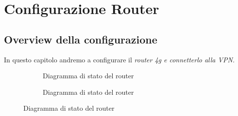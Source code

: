 
\chapter{Configurazione Router}

\section{Overview della configurazione}

In questo capitolo andremo a configurare il \it{router 4g} e connetterlo alla VPN.

\newsavebox{\myimage}

\begin{figure}[H]
    \centering%
    \begin{subfigure}{0.4\textwidth}
        \centering
        \usebox{\myimage}
        \caption{Diagramma di stato del router}
        \label{fig:diag-router}
    \end{subfigure}
    \hfill%
    \begin{subfigure}{0.5\textwidth}
        \centering
        \caption{Diagramma di stato del router}
        \label{fig:diag-router1}
    \end{subfigure}
\end{figure}

